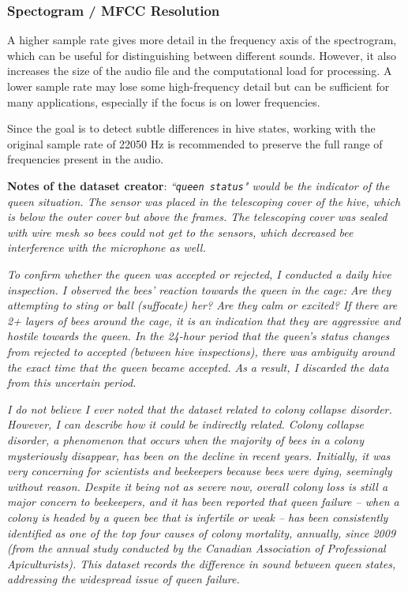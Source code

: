 \documentclass[12pt]{report}
\begin{document}
\subsubsection{Spectogram / MFCC Resolution}

\par A higher sample rate gives more detail in the frequency axis of the spectrogram, which can be useful for distinguishing between different sounds. However, it also increases the size of the audio file and the computational load for processing. A lower sample rate may lose some high-frequency detail but can be sufficient for many applications, especially if the focus is on lower frequencies.

\par Since the goal is to detect subtle differences in hive states, working with the original sample rate of 22050 Hz is recommended to preserve the full range of frequencies present in the audio.

\par\textbf{Notes of the dataset creator}: \textit{``{\tt queen status}" would be the indicator of the queen situation. The sensor was placed in the telescoping cover of the hive, which is below the outer cover but above the frames. The telescoping cover was sealed with wire mesh so bees could not get to the sensors, which decreased bee interference with the microphone as well.}

\par\textit{To confirm whether the queen was accepted or rejected, I conducted a daily hive inspection. I observed the bees’ reaction towards the queen in the cage: Are they attempting to sting or ball (suffocate) her? Are they calm or excited? If there are 2+ layers of bees around the cage, it is an indication that they are aggressive and hostile towards the queen. In the 24-hour period that the queen’s status changes from rejected to accepted (between hive inspections), there was ambiguity around the exact time that the queen became accepted. As a result, I discarded the data from this uncertain period.}

\par\textit{I do not believe I ever noted that the dataset related to colony collapse disorder. However, I can describe how it could be indirectly related. Colony collapse disorder, a phenomenon that occurs when the majority of bees in a colony mysteriously disappear, has been on the decline in recent years. Initially, it was very concerning for scientists and beekeepers because bees were dying, seemingly without reason. Despite it being not as severe now, overall colony loss is still a major concern to beekeepers, and it has been reported that queen failure -- when a colony is headed by a queen bee that is infertile or weak -- has been consistently identified as one of the top four causes of colony mortality, annually, since 2009 (from the annual study conducted by the Canadian Association of Professional Apiculturists). This dataset records the difference in sound between queen states, addressing the widespread issue of queen failure.}
\end{document}
